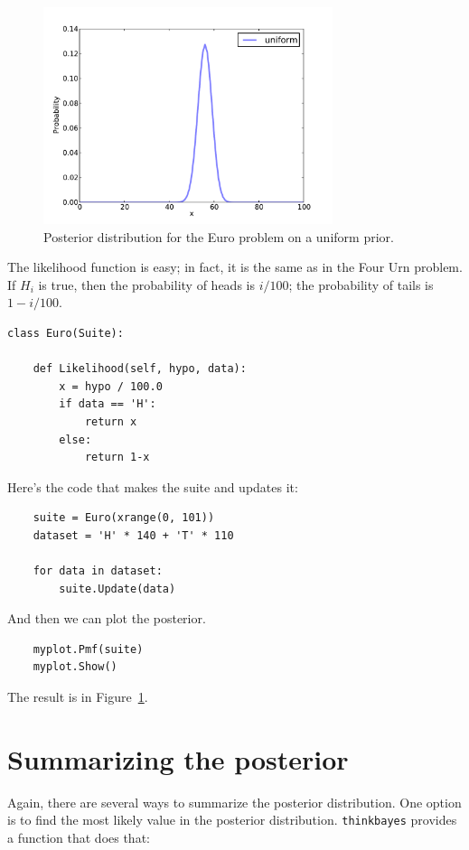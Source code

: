 \documentclass[12pt]{book}
\begin{document}
\begin{figure}
\centerline{\includegraphics[height=2.5in]{figs/euro1.pdf}}
\caption{Posterior distribution for the Euro problem
on a uniform prior.}
\label{fig.euro1}
\end{figure}

The likelihood function is easy; in fact, it is the same as in
the Four Urn problem.  If $H_i$ is true, then the probability of
heads is $i/100$; the probability of tails is $1- i/100$.

\begin{verbatim}
class Euro(Suite):

    def Likelihood(self, hypo, data):
        x = hypo / 100.0
        if data == 'H':
            return x
        else:
            return 1-x
\end{verbatim}

Here's the code that makes the suite and updates it:

\begin{verbatim}
    suite = Euro(xrange(0, 101))
    dataset = 'H' * 140 + 'T' * 110

    for data in dataset:
        suite.Update(data)
\end{verbatim}

And then we can plot the posterior.

\begin{verbatim}
    myplot.Pmf(suite)
    myplot.Show()
\end{verbatim}

The result is in Figure~\ref{fig.euro1}.


\section{Summarizing the posterior}

Again, there are several ways to summarize the posterior distribution.
One option is to find the most likely value in the posterior
distribution.  \verb"thinkbayes" provides a function that does 
that:
\end{document}
